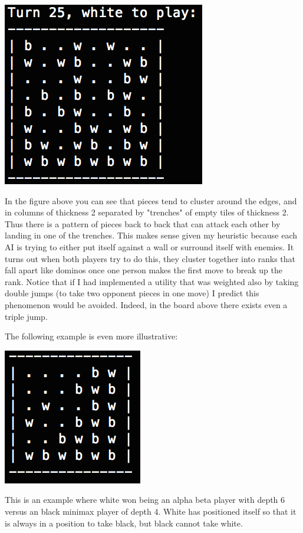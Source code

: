 \documentclass[12pt]{article}
\begin{document}
\includegraphics{./images/example1.png}

In the figure above you can see that pieces tend to cluster around the edges, and in columns of thickness 2 separated by "trenches" of empty tiles of thickness 2. Thus there is a pattern of pieces  back to back that can attack each other by landing in one of the trenches. This makes sense given my heuristic because each AI is trying to either put itself against a wall or surround itself with enemies. It turns out when both players try to do this, they cluster together into ranks that  fall apart like dominos once one person makes the first move to break up the rank. Notice that if I had implemented a utility that was weighted also by taking double jumps (to take two opponent pieces in one move) I predict this phenomenon would be avoided. Indeed, in the board above there exists even a triple jump. 

The following example is even more illustrative: 

\includegraphics{./images/example2.png}

This is an example where white won being an alpha beta player with depth 6 versus an black minimax player of depth 4. White has positioned itself so that it is always in a position to take black, but black cannot take white. 
\end{document}
